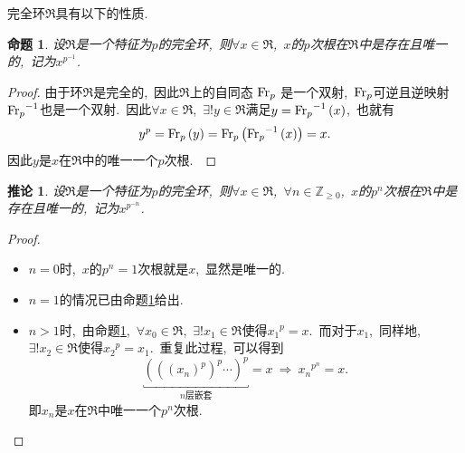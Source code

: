 \documentclass[UTF8, twoside]{ctexart}
\theoremstyle{nonumberplain}
\newtheorem{proof}{\heiti 证明}  %
\theoremstyle{nonumberplain}
\theoremstyle{plain}
\newtheorem{tuilun}[dingyi]{推论}
\newtheorem{mingti}[dingyi]{命题}
\begin{document}
	完全环$\Re $具有以下的性质.\ 
	\begin{mingti} \label{mingti_3.1.6}
		设$\Re $是一个特征为$p$的完全环,\ 则$\forall x\in \Re $,\ $x$的$p$次根在$\Re $中是存在且唯一的,\ 记为${{x}^{{{p}^{-1}}}}$.
	\end{mingti}
	\begin{proof}
		由于环$\Re $是完全的,\ 因此$\Re $上的自同态
		$\textup{Fr}_p$
		是一个双射,\ $\textup{Fr}_p$可逆且逆映射${\textup{Fr}_p}^{-1}$也是一个双射.\ 因此$\forall x\in \Re $,\ $\exists !y\in \Re $满足$y={\textup{Fr}_p}^{-1}\left( x \right)$,\ 也就有
		\[
			{{y}^{p}}=\textup{Fr}_p\left( y \right)=\textup{Fr}_p\left( {\textup{Fr}_p}^{-1}\left( x \right) \right)=x.
		\]
		因此$y$是$x$在$\Re $中的唯一一个$p$次根.\ 
	\end{proof}
	\begin{tuilun} \label{完全环幂次根存在性}
		设$\Re $是一个特征为$p$的完全环,\ 则$\forall x\in \Re $,\ $\forall n\in {{\mathbb{Z}}_{\ge 0}}$,\ $x$的${{p}^{n}}$次根在$\Re $中是存在且唯一的,\ 记为${{x}^{{{p}^{-n}}}}$.\ 
	\end{tuilun}
	\begin{proof}
		\ 
		\begin{itemize}
			\item $n=0$时,\ $x$的${{p}^{n}}=1$次根就是$x$,\ 显然是唯一的.\ 
			
			\item $n=1$的情况已由命题\ref{mingti_3.1.6}给出.\ 
			
			\item $n>1$时,\ 由命题\ref{mingti_3.1.6},\ $\forall {{x}_{0}}\in \Re $,\ $\exists !{{x}_{1}}\in \Re $使得${{x}_{1}}^{p}=x$.\ 而对于${{x}_{1}}$,\ 同样地,\ $\exists !{{x}_{2}}\in \Re $使得${{x}_{2}}^{p}={{x}_{1}}$.\ 重复此过程,\ 可以得到
			\[
				\underbracket{{\left( {{\left( {{\left( {{x}_{n}} \right)}^{p}} \right)}^{p}}\cdots  \right)}^{p}}
				_{n\text{层嵌套}}=x
				\ \Longrightarrow \ 
				{{x}_{n}}^{{{p}^{n}}}=x.
			\]
			即${{x}_{n}}$是$x$在$\Re $中唯一一个${{p}^{n}}$次根.
		\end{itemize}
	\end{proof}
	\vskip 0.5cm
	
\end{document}

